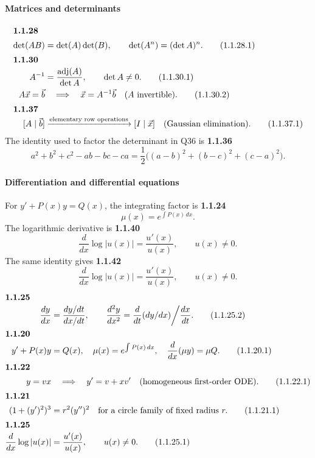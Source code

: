 \paragraph*{Matrices and determinants}
\begin{align}\intertext{\textbf{1.1.28}}
\det(AB)&=\det(A)\det(B),\qquad \det(A^n)=(\det A)^n. \tag{1.1.28.1}\\
\intertext{\textbf{1.1.30}}
A^{-1}&=\frac{\operatorname{adj}(A)}{\det A},\qquad \det A\ne0. \tag{1.1.30.1}\\
A\vec x=\vec b&\quad\Longrightarrow\quad \vec x=A^{-1}\vec b\quad(A\text{ invertible}). \tag{1.1.30.2}\\
\intertext{\textbf{1.1.37}}
[A\mid \vec b]&\xrightarrow{\text{elementary row operations}}[I\mid\vec x]\quad\text{(Gaussian elimination)}. \tag{1.1.37.1}
\end{align}
The identity used to factor the determinant in Q36 is
\noindent\textbf{1.1.36}\quad
\[
a^2+b^2+c^2-ab-bc-ca=\frac12\bigl((a-b)^2+(b-c)^2+(c-a)^2\bigr).\tag{1.1.36.1}
\]

\paragraph*{Differentiation and differential equations}
For $y' + P(x)y=Q(x)$, the integrating factor is
\noindent\textbf{1.1.24}\quad
\begin{equation}
\mu(x)=e^{\int P(x)\,dx}.\tag{1.1.24.1}\label{eq:if-24}
\end{equation}
The logarithmic derivative is
\noindent\textbf{1.1.40}\quad
\begin{equation}
\frac{d}{dx}\log|u(x)|=\frac{u'(x)}{u(x)},\qquad u(x)\ne0.\tag{1.1.40.1}\label{eq:log-derivative-40}
\end{equation}
The same identity gives
\noindent\textbf{1.1.42}\quad
\begin{equation}
\frac{d}{dx}\log|u(x)|=\frac{u'(x)}{u(x)},\qquad u(x)\ne0.\tag{1.1.42.1}\label{eq:log-derivative-42}
\end{equation}
\begin{align}\intertext{\textbf{1.1.25}}
\frac{dy}{dx}&=\frac{dy/dt}{dx/dt},\qquad \frac{d^2y}{dx^2}=\frac{d}{dt}(dy/dx)\bigg/\frac{dx}{dt}. \tag{1.1.25.2}\\
\intertext{\textbf{1.1.20}}
y'+P(x)y&=Q(x),\quad \mu(x)=e^{\int P(x)\,dx},\quad \frac{d}{dx}(\mu y)=\mu Q. \tag{1.1.20.1}\\
\intertext{\textbf{1.1.22}}
y=vx&\quad\Longrightarrow\quad y'=v+xv'\quad\text{(homogeneous first-order ODE)}. \tag{1.1.22.1}\\
\intertext{\textbf{1.1.21}}
(1+(y')^2)^3&=r^2(y'')^2\quad\text{for a circle family of fixed radius }r. \tag{1.1.21.1}\\
\intertext{\textbf{1.1.25}}
\frac{d}{dx}\log|u(x)|&=\frac{u'(x)}{u(x)},\qquad u(x)\ne0. \tag{1.1.25.1}
\end{align}

